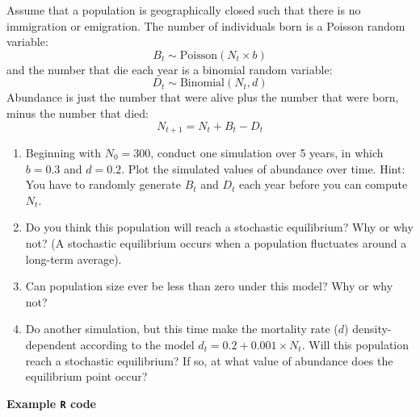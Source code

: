 \documentclass[12pt]{article}\usepackage[]{graphicx}\usepackage[]{xcolor}
\begin{document}
Assume that a population is geographically closed such that there is
no immigration or emigration. The number of individuals born is a
Poisson random variable:
\[
  B_t \sim \mathrm{Poisson}(N_t \times b)
\]
and the number that die each year is a binomial random variable:
\[
  D_t \sim \mathrm{Binomial}(N_t, d)
\]
Abundance is just the number that were alive plus the number that were
born, minus the number that died:
\[
  N_{t+1} = N_t + B_t - D_t
\]
\begin{enumerate}
  \item Beginning with $N_0=300$, conduct one simulation over 5
    years, in which $b=0.3$ and $d=0.2$. Plot the simulated values of
    abundance over time. Hint: You have  to randomly generate $B_t$
    and $D_t$ each year before you can compute  $N_t$.
  \item Do you think this population will reach a stochastic
    equilibrium? Why or why not? (A stochastic equilibrium occurs when
    a population fluctuates around a long-term average).
  \item Can population size ever be less than zero under this model?
    Why or why not?
  \item Do another simulation, but this time make the mortality rate
    ($d$) density-dependent according to the model $d_t = 0.2 +
    0.001\times N_t$. Will this population reach a stochastic equilibrium? If
    so, at what value of abundance does the equilibrium point occur?
\end{enumerate}


\newpage

{\bf Example {\tt R} code \\}


\end{document}
